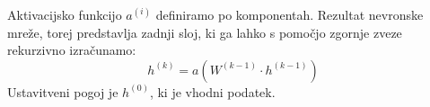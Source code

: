 Aktivacijsko funkcijo $a^{(i)}$ definiramo po komponentah. Rezultat nevronske mreže, torej predstavlja zadnji sloj, ki ga lahko s pomočjo zgornje zveze rekurzivno izračunamo:
\begin{equation}
  h^{(k)} = a(W^{(k - 1)} \cdot h^{(k - 1)})
  \label{eq:eq1}
\end{equation}
Ustavitveni pogoj je $h^{(0)}$, ki je vhodni podatek.


